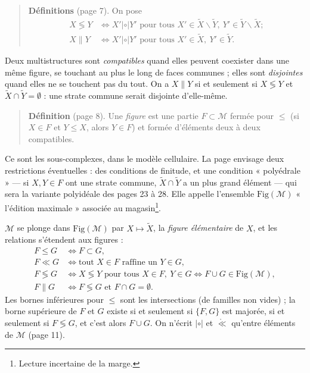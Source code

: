 \documentclass[11pt,a4paper]{article}
\begin{document}
\begin{quote}
\textbf{Définitions} (page 7). On pose
\[
\begin{aligned}
X \lessgtr Y &\iff X' \mathrel{|\circ|} Y' \text{ pour tous } X' \in
\widetilde{X} \smallsetminus \widetilde{Y},\ Y' \in \widetilde{Y}
\smallsetminus \widetilde{X} ; \\
X \parallel Y &\iff X' \mathrel{|\circ|} Y' \text{ pour tous } X' \in
\widetilde{X},\ Y' \in \widetilde{Y}.
\end{aligned}
\]
\end{quote}

Deux multistructures sont \emph{compatibles} quand elles peuvent coexister
dans une même figure, se touchant au plus le long de faces communes ; elles
sont \emph{disjointes} quand elles ne se touchent pas du tout. On a $X \parallel
Y$ si et seulement si $X \lessgtr Y$ et $\widetilde{X} \cap \widetilde{Y} =
\emptyset$ : une strate commune serait disjointe d'elle-même.

\begin{quote}
\textbf{Définition} (page 8). Une \emph{figure} est une partie $F \subset
\mathcal{M}$ fermée pour $\leq$ (si $X \in F$ et $Y \leq X$, alors $Y \in F$)
et formée d'éléments deux à deux compatibles.
\end{quote}

Ce sont les sous-complexes, dans le modèle cellulaire. La page envisage deux
restrictions éventuelles : des conditions de finitude, et une condition
« polyédrale » --- si $X, Y \in F$ ont une strate commune, $\widetilde{X} \cap
\widetilde{Y}$ a un plus grand élément --- qui sera la variante polyidéale des
pages 23 à 28. Elle appelle l'ensemble $\mathrm{Fig}(\mathcal{M})$ « l'édition
maximale » associée au magasin\footnote{Lecture incertaine de la marge.}.

$\mathcal{M}$ se plonge dans $\mathrm{Fig}(\mathcal{M})$ par $X \mapsto
\widetilde{X}$, la \emph{figure élémentaire} de $X$, et les relations
s'étendent aux figures :
\[
\begin{aligned}
F \leq G &\iff F \subset G, \\
F \ll G &\iff \text{tout } X \in F \text{ raffine un } Y \in G, \\
F \lessgtr G &\iff X \lessgtr Y \text{ pour tous } X \in F,\ Y \in G
\iff F \cup G \in \mathrm{Fig}(\mathcal{M}), \\
F \parallel G &\iff F \lessgtr G \text{ et } F \cap G = \emptyset .
\end{aligned}
\]
Les bornes inférieures pour $\leq$ sont les intersections (de familles non
vides) ; la borne supérieure de $F$ et $G$ existe si et seulement si $\{F,G\}$
est majorée, si et seulement si $F \lessgtr G$, et c'est alors $F \cup G$. On
n'écrit $\mathrel{|\circ|}$ et $\mathring{\ll}$ qu'entre éléments de
$\mathcal{M}$ (page 11).
\end{document}
